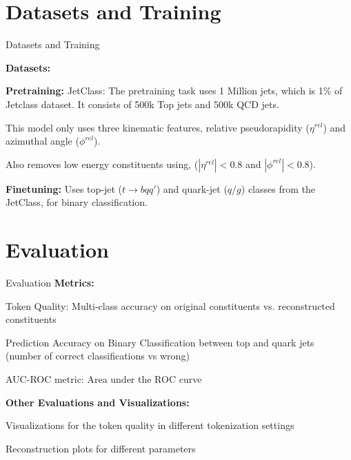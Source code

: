 \documentclass[10pt]{beamer}
\let\olditemize\itemize
\let\endolditemize\enditemize
\renewenvironment{itemize}{
  \olditemize[<+->] %
}{\endolditemize}
\begin{document}
\section{Datasets and Training}
\begin{frame}{Datasets and Training}

\textbf{Datasets:}
\vspace{1em}

  \textbf{Pretraining:} JetClass: The pretraining task uses 1 Million jets, which is 1\% of Jetclass dataset.
It consists of 500k Top jets and 500k QCD jets.

\begin{itemize}
  \item This model only uses three kinematic features, relative pseudorapidity ($\eta^{rel}$) and azimuthal angle ($\phi^{rel}$).
  \item Also removes low energy constituents using,  ($|\eta^{rel}| < 0.8$ and $|\phi^{rel}| < 0.8$).
\end{itemize}

\textbf{Finetuning:}
Uses top-jet ($t \rightarrow bqq'$) and quark-jet ($q/g$) classes from the JetClass, for binary classification.

\end{frame}

\section{Evaluation}

\begin{frame}{Evaluation}
\textbf{Metrics:}

\begin{itemize}
  \item Token Quality: Multi-class accuracy on original constituents vs. reconstructed constituents
  \item Prediction Accuracy on Binary Classification between top and quark jets (number of correct classifications vs wrong)
  \item AUC-ROC metric: Area under the ROC curve
\end{itemize}


\textbf{Other Evaluations and Visualizations:}

\begin{itemize}
  \item Visualizations for the token quality in different tokenization settings
  \item Reconstruction plots for different parameters
\end{itemize}

\end{frame}
\end{document}
